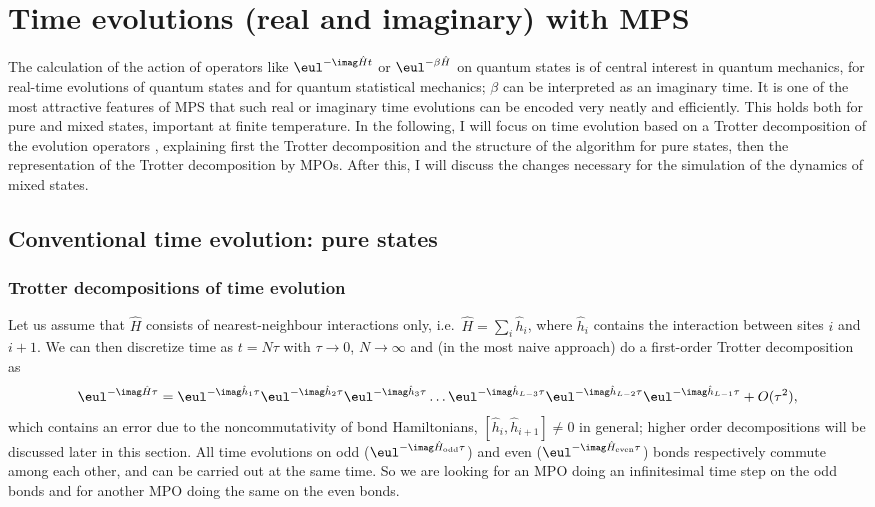 \section{Time evolutions (real and imaginary) with MPS}
The calculation of the action of operators like $\eul^{-\imag \hat{H}t}$ or $\eul^{-\beta\hat{H}}$ on quantum states is of central interest in quantum mechanics, for real-time evolutions of quantum states and for quantum statistical mechanics; $\beta$ can be interpreted as an imaginary time. It is one of the most attractive features of MPS that such real or imaginary time evolutions can be encoded very neatly and efficiently. This holds both for pure and mixed states, important at finite temperature. In the following, I will focus on time evolution based on a Trotter decomposition of the evolution operators \cite{Vidal03a,Vidal04b,Daley04,WhiteFeiguin04,VerstraeteRipoll04}, explaining first the Trotter decomposition and the structure of the algorithm for pure states, then the representation of the Trotter decomposition by MPOs. After this, I will discuss the changes necessary for the simulation of the dynamics of mixed states.
\subsection{Conventional time evolution: pure states}

\subsubsection{Trotter decompositions of time evolution}
Let us assume that $\hat{H}$ consists of nearest-neighbour interactions only, i.e.\ $\hat{H} = \sum_i \hat{h}_i$, where $\hat{h}_i$ contains the interaction between sites $i$ and $i+1$. We can then discretize time as $t = N \tau$ with $\tau\rightarrow 0$, $N \rightarrow \infty$ and (in the most naive approach) do a first-order Trotter decomposition as
\begin{equation}
\eul^{-\imag \hat{H}\tau} = \eul^{-\imag  \hat{h}_1 \tau}\eul^{-\imag  \hat{h}_2 \tau}\eul^{-\imag  \hat{h}_3 \tau} \ldots  \eul^{-\imag  \hat{h}_{L-3} \tau}\eul^{-\imag  \hat{h}_{L-2} \tau}\eul^{-\imag  \hat{h}_{L-1} \tau} + O(\tau^2),
\end{equation}
which contains an error due to the noncommutativity of bond Hamiltonians, $[ \hat{h}_i,\hat{h}_{i+1}] \neq 0$ in general; higher order decompositions will be discussed later in this section. All time evolutions on odd ($\eul^{-\imag \hat{H}_{{\rm odd}} \tau}$) and even ($\eul^{-\imag \hat{H}_{{\rm even}} \tau}$) bonds respectively commute among each other, and can be carried out at the same time. So we are looking for an MPO doing an infinitesimal time step on the odd bonds and for another MPO doing the same on the even bonds.

